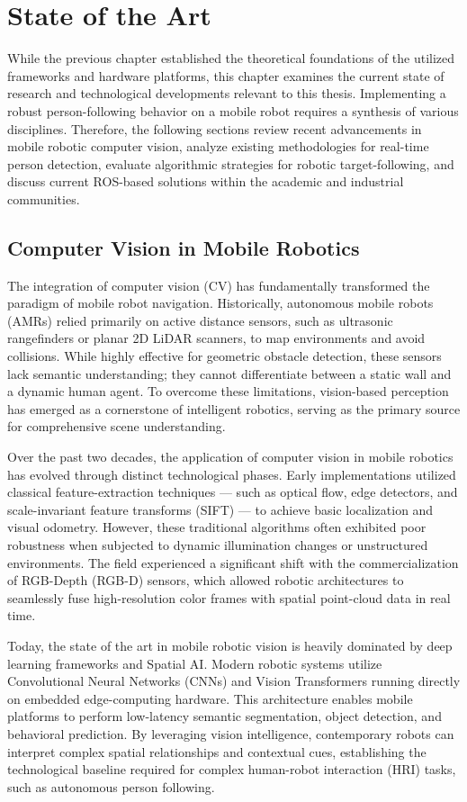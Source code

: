 \chapter{State of the Art}
While the previous chapter established the theoretical foundations of the utilized frameworks and hardware platforms, this chapter examines the current state of research and technological developments relevant to this thesis. Implementing a robust person-following behavior on a mobile robot requires a synthesis of various disciplines. Therefore, the following sections review recent advancements in mobile robotic computer vision, analyze existing methodologies for real-time person detection, evaluate algorithmic strategies for robotic target-following, and discuss current ROS-based solutions within the academic and industrial communities.

\section{Computer Vision in Mobile Robotics}
The integration of computer vision (CV) has fundamentally transformed the paradigm of mobile robot navigation. Historically, autonomous mobile robots (AMRs) relied primarily on active distance sensors, such as ultrasonic rangefinders or planar 2D LiDAR scanners, to map environments and avoid collisions. While highly effective for geometric obstacle detection, these sensors lack semantic understanding; they cannot differentiate between a static wall and a dynamic human agent. To overcome these limitations, vision-based perception has emerged as a cornerstone of intelligent robotics, serving as the primary source for comprehensive scene understanding.

Over the past two decades, the application of computer vision in mobile robotics has evolved through distinct technological phases. Early implementations utilized classical feature-extraction techniques — such as optical flow, edge detectors, and scale-invariant feature transforms (SIFT) — to achieve basic localization and visual odometry. However, these traditional algorithms often exhibited poor robustness when subjected to dynamic illumination changes or unstructured environments. The field experienced a significant shift with the commercialization of RGB-Depth (RGB-D) sensors, which allowed robotic architectures to seamlessly fuse high-resolution color frames with spatial point-cloud data in real time. 

Today, the state of the art in mobile robotic vision is heavily dominated by deep learning frameworks and Spatial AI. Modern robotic systems utilize Convolutional Neural Networks (CNNs) and Vision Transformers running directly on embedded edge-computing hardware. This architecture enables mobile platforms to perform low-latency semantic segmentation, object detection, and behavioral prediction. By leveraging vision intelligence, contemporary robots can interpret complex spatial relationships and contextual cues, establishing the technological baseline required for complex human-robot interaction (HRI) tasks, such as autonomous person following.

